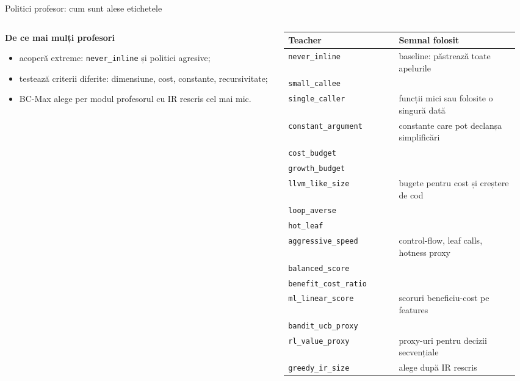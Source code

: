 \documentclass[aspectratio=169,11pt]{beamer}
\begin{document}
\begin{frame}[shrink=2]{Politici profesor: cum sunt alese etichetele}
\begin{columns}[T,onlytextwidth]
\begin{column}{0.49\textwidth}
\textbf{De ce mai mulți profesori}
\begin{itemize}
  \item acoperă extreme: \texttt{never\_inline} și politici agresive;
  \item testează criterii diferite: dimensiune, cost, constante, recursivitate;
  \item BC-Max alege per modul profesorul cu IR rescris cel mai mic.
\end{itemize}
\vspace{0.12cm}
\begin{center}
\end{center}
\end{column}
\begin{column}{0.49\textwidth}
\tiny
\begin{tabular}{@{}p{0.45\linewidth}p{0.49\linewidth}@{}}
\toprule
\textbf{Teacher} & \textbf{Semnal folosit} \\
\midrule
\texttt{never\_inline} & baseline: păstrează toate apelurile \\
\texttt{small\_callee}\\\texttt{single\_caller} & funcții mici sau folosite o singură dată \\
\texttt{constant\_argument} & constante care pot declanșa simplificări \\
\texttt{cost\_budget}\\\texttt{growth\_budget}\\\texttt{llvm\_like\_size} & bugete pentru cost și creștere de cod \\
\texttt{loop\_averse}\\\texttt{hot\_leaf}\\\texttt{aggressive\_speed} & control-flow, leaf calls, hotness proxy \\
\texttt{balanced\_score}\\\texttt{benefit\_cost\_ratio}\\\texttt{ml\_linear\_score} & scoruri beneficiu-cost pe features \\
\texttt{bandit\_ucb\_proxy}\\\texttt{rl\_value\_proxy} & proxy-uri pentru decizii secvențiale \\
\texttt{greedy\_ir\_size} & alege după IR rescris \\
\bottomrule
\end{tabular}
\end{column}
\end{columns}
\end{frame}
\end{document}
